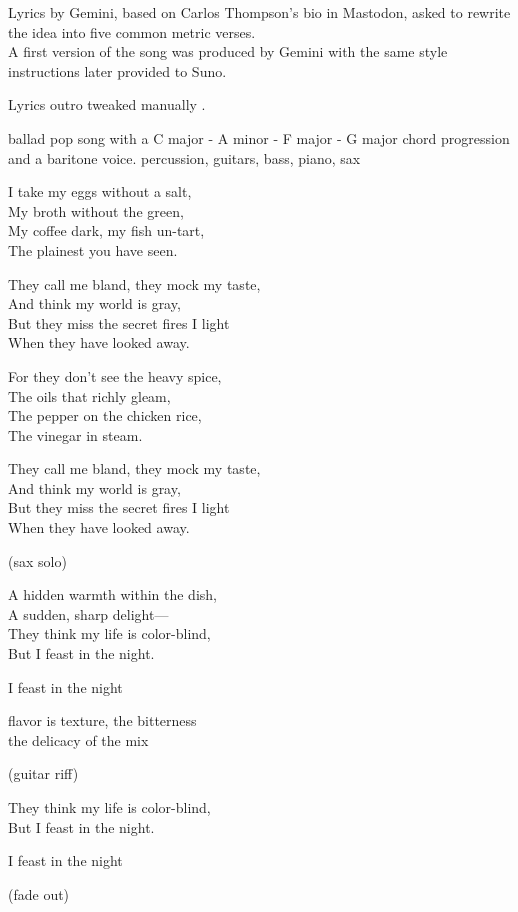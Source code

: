 

\begin{notes}
Lyrics by Gemini, based on Carlos Thompson's bio in Mastodon, asked to rewrite the idea into five common metric verses.\\
A first version of the song was produced by Gemini with the same style instructions later provided to Suno.

Lyrics outro tweaked manually .
\end{notes}
\begin{style}
ballad pop song with a C major - A minor - F major - G major chord progression and a baritone voice. %
percussion, guitars, bass, piano, sax
\end{style}
\begin{lyrics}
I take my eggs without a salt,\\
My broth without the green,\\
My coffee dark, my fish un-tart,\\
The plainest you have seen.

They call me bland, they mock my taste,\\
And think my world is gray,\\
But they miss the secret fires I light\\
When they have looked away.

For they don't see the heavy spice,\\
The oils that richly gleam,\\
The pepper on the chicken rice,\\
The vinegar in steam.

They call me bland, they mock my taste,\\
And think my world is gray,\\
But they miss the secret fires I light\\
When they have looked away.

(sax solo)

A hidden warmth within the dish,\\
A sudden, sharp delight—\\
They think my life is color-blind,\\
But I feast in the night.

I feast in the night

flavor is texture, the bitterness\\
the delicacy of the mix

(guitar riff)

They think my life is color-blind,\\
But I feast in the night.

I feast in the night

(fade out)
\end{lyrics}

